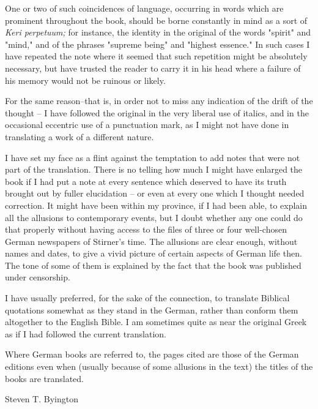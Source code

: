 \documentclass[a4paper]{book}
\begin{document}
One or two of such coincidences of language, occurring in words which are 
prominent throughout the book, should be borne constantly in mind as a sort of 
\textit{Keri perpetuum;} for instance, the identity in the original of the 
words "{}spirit"{} and "{}mind,"{} and of the phrases "{}supreme being"{} and 
"{}highest essence."{} In such cases I have repeated the note where it seemed 
that such repetition might be absolutely necessary, but have trusted the 
reader to carry it in his head where a failure of his memory would not be 
ruinous or likely.

For the same reason--that is, in order not to miss any indication of the drift 
of the thought -- I have followed the original in the very liberal use of 
italics, and in the occasional eccentric use of a punctuation mark, as I might 
not have done in translating a work of a different nature.

I have set my face as a flint against the temptation to add notes that were 
not part of the translation. There is no telling how much I might have 
enlarged the book if I had put a note at every sentence which deserved to have 
its truth brought out by fuller elucidation -- or even at every one which I 
thought needed correction. It might have been within my province, if I had 
been able, to explain all the allusions to contemporary events, but I doubt 
whether any one could do that properly without having access to the files of 
three or four well-chosen German newspapers of Stirner's time. The allusions 
are clear enough, without names and dates, to give a vivid picture of certain 
aspects of German life then. The tone of some of them is explained by the fact 
that the book was published under censorship.

I have usually preferred, for the sake of the connection, to translate 
Biblical quotations somewhat as they stand in the German, rather than conform 
them altogether to the English Bible. I am sometimes quite as near the 
original Greek as if I had followed the current translation.

Where German books are referred to, the pages cited are those of the German 
editions even when (usually because of some allusions in the text) the titles 
of the books are translated.

\begin{flushright}
Steven T. Byington\end{flushright}


\newpage{}

~
\end{document}
